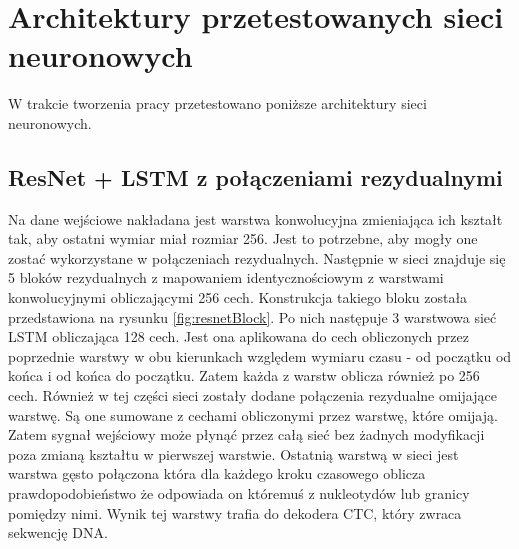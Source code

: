 \documentclass[a4paper,11pt,twoside]{report}
\theoremstyle{definition}
\begin{document}
\section{Architektury przetestowanych sieci neuronowych}

W trakcie tworzenia pracy przetestowano poniższe architektury sieci neuronowych.

\subsection{ResNet + LSTM z połączeniami rezydualnymi}

Na dane wejściowe nakładana jest warstwa konwolucyjna zmieniająca ich kształt tak, aby ostatni wymiar miał rozmiar 256. Jest to potrzebne, aby mogły one zostać wykorzystane w połączeniach rezydualnych. Następnie w sieci znajduje się 5 bloków rezydualnych z mapowaniem identycznościowym z warstwami konwolucyjnymi obliczającymi 256 cech. Konstrukcja takiego bloku została przedstawiona na rysunku \ref{fig:resnetBlock}. Po nich następuje 3 warstwowa sieć LSTM obliczająca 128 cech. Jest ona aplikowana do cech obliczonych przez poprzednie warstwy w obu kierunkach względem wymiaru czasu - od początku od końca i od końca do początku. Zatem każda z warstw oblicza również po 256 cech. Również w tej części sieci zostały dodane połączenia rezydualne omijające warstwę. Są one sumowane z cechami obliczonymi przez warstwę, które omijają. Zatem sygnał wejściowy może płynąć przez całą sieć bez żadnych modyfikacji poza zmianą kształtu w pierwszej warstwie. Ostatnią warstwą w sieci jest warstwa gęsto połączona która dla każdego kroku czasowego oblicza prawdopodobieństwo że odpowiada on któremuś z nukleotydów lub granicy pomiędzy nimi. Wynik tej warstwy trafia do dekodera CTC, który zwraca sekwencję DNA.
\end{document}
